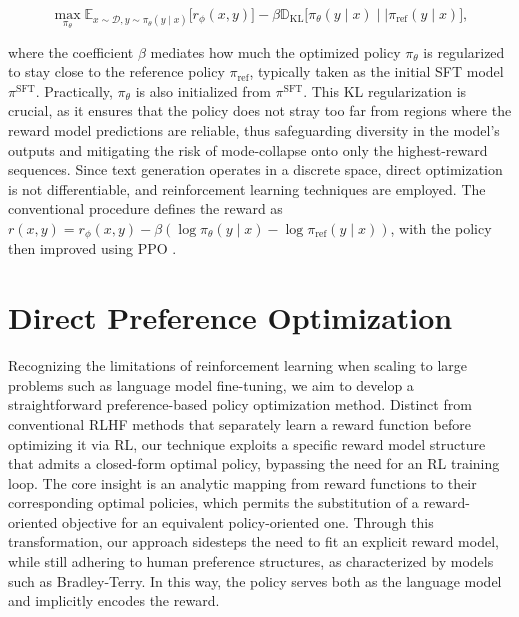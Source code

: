 \begin{equation}\label{eq:RL}
\max_{\pi_{\theta}}  \mathbb{E}_{x\sim \mathcal{D}, y\sim \pi_{\theta}(y \mid x)}\bigl[r_{\phi}(x, y)\bigr] - \beta\mathbb{D}_{\textrm{KL}}\bigl[\pi_{\theta}(y\mid x)\mid \mid \pi_\text{ref}(y\mid x)\bigr],
\end{equation}

where the coefficient $\beta$ mediates how much the optimized policy $\pi_\theta$ is regularized to stay close to the reference policy $\pi_\text{ref}$, typically taken as the initial SFT model $\pi^\text{SFT}$. Practically, $\pi_\theta$ is also initialized from $\pi^\text{SFT}$. This KL regularization is crucial, as it ensures that the policy does not stray too far from regions where the reward model predictions are reliable, thus safeguarding diversity in the model's outputs and mitigating the risk of mode-collapse onto only the highest-reward sequences. Since text generation operates in a discrete space, direct optimization is not differentiable, and reinforcement learning techniques are employed. The conventional procedure \citep{ziegler2020finetuning, stiennon2022learning, bai2022training, ouyang2022training} defines the reward as ${r(x, y) = r_{\phi}(x, y) -\beta (\log \pi_{\theta}(y\mid x) - \log \pi_\text{ref}(y\mid x))}$, with the policy then improved using PPO \cite{schulman2017proximal}.

\section{Direct Preference Optimization}\label{sec:DPO}

Recognizing the limitations of reinforcement learning when scaling to large problems such as language model fine-tuning, we aim to develop a straightforward preference-based policy optimization method. Distinct from conventional RLHF methods that separately learn a reward function before optimizing it via RL, our technique exploits a specific reward model structure that admits a closed-form optimal policy, bypassing the need for an RL training loop. The core insight is an analytic mapping from reward functions to their corresponding optimal policies, which permits the substitution of a reward-oriented objective for an equivalent policy-oriented one. Through this transformation, our approach sidesteps the need to fit an explicit reward model, while still adhering to human preference structures, as characterized by models such as Bradley-Terry. In this way, the policy serves both as the language model and implicitly encodes the reward.

